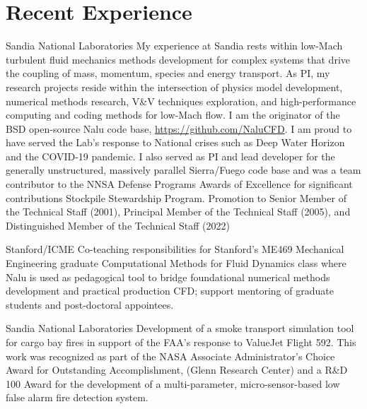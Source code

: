 \documentclass[letterpaper]{twentysecondcv_spd} %
\begin{document}
\section{Recent Experience}

\begin{twenty} %

    {Sandia National Laboratories} {My experience at Sandia rests within low-Mach 
    turbulent fluid mechanics methods development for complex systems that drive the coupling of mass, momentum, species and energy transport. 
    As PI, my research projects reside within the intersection of physics model development, numerical methods research, V\&V techniques exploration, and 
    high-performance computing and coding methods for low-Mach flow. I am the originator of the BSD open-source Nalu
    code base, \underline{https://github.com/NaluCFD}. I am proud to have served the Lab's response to National crises 
    such as Deep Water Horizon and the COVID-19 pandemic. I also served as PI and lead developer for the generally unstructured, massively 
    parallel Sierra/Fuego code base and was a team contributor to the NNSA Defense Programs Awards of Excellence for 
    significant contributions Stockpile Stewardship Program. Promotion to Senior Member of the Technical Staff (2001), Principal Member of the Technical Staff (2005), and 
    Distinguished Member of the Technical Staff (2022)}

    {Stanford/ICME} {Co-teaching responsibilities for Stanford's ME469 Mechanical Engineering graduate Computational 
   Methods for Fluid Dynamics class where Nalu is used as pedagogical tool to bridge foundational numerical methods development and practical production CFD;
   support mentoring of graduate students and post-doctoral appointees.}
    
   {Sandia National Laboratories}  {Development of a smoke transport simulation tool for cargo bay 
  fires in support of the FAA's response to ValueJet Flight 592. This work was recognized as part of the NASA Associate Administrator's Choice Award for Outstanding Accomplishment, (Glenn Research Center) 
  and a R\&D 100 Award for the development of a multi-parameter, micro-sensor-based low false alarm fire detection system.}
  
\end{twenty}
\end{document}
